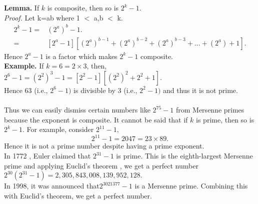 \documentclass[a4paper,11pt]{article}
\begin{document}
\noindent \textbf{Lemma.} If $k$ is composite, then so is $2^k - 1.$\\ \textit{Proof.}  Let k=ab where 1 $<$ a,b $<$ k.
\begin{align*}
2^k - 1 =& (2^a)^b - 1.\\
=& [2^a-1] [(2^a)^{b-1} + (2^a)^{b-2} + (2^a)^{b-3} + ... + (2^a) + 1].
\end{align*}
Hence $ 2^
a - 1$ is  a factor which makes $2^k-1$ composite.\\\textbf{Example.} If $k = 6 = 2 \times 3$, then,\\
$2^
6 - 1 = (2^2
)^
3 -1 = [2^2 -1][(2^2
)^
2 + 2^
2 + 1].$ \\
Hence 63 (i.e., $2^
6 - 1)$ is divisible by 3 (i.e., $2^
2 - 1)$ and thus it is not prime.\\
\\
Thus we can easily dismiss certain numbers like $2^
{75} - 1$ from 
 Mersenne primes because the exponent is composite. 
It cannot be said that if $k$ is 
prime, then so is $ 2^
k - 1. $ For example, consider $2^
{11} - 1,$ \\
$$2^
{11} - 1 = 2047 = 23 \times 89. $$
Hence it is not a prime number despite having a prime exponent.\\
 In  1772 ,
 Euler claimed that $2^
{31} -1$ is prime.
This is the eighth-largest Mersenne prime and applying Euclid's theorem ,
we get a perfect number
$2^
{30}
(2^{31} - 1) = 2,305,843,008,139,952,128. $\\
In 1998, it was announced that$ 2^
{3021377} - 1$ is a Mersenne prime. Combining this with Euclid's theorem, we get a perfect number.
 
\end{document}
